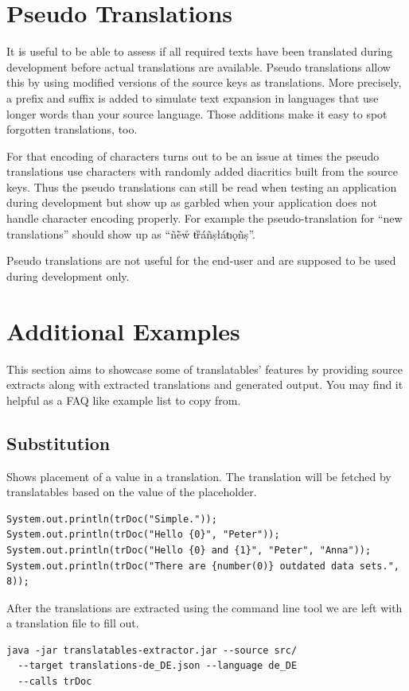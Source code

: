 \documentclass[a4paper,11pt,twoside]{report}
\begin{document}
\section{Pseudo Translations}
It is useful to be able to assess if all required texts have been translated during development before actual translations are available. Pseudo translations allow this by using modified versions of the source keys as translations. More precisely, a prefix and suffix is added to simulate text expansion in languages that use longer words than your source language. Those additions make it easy to spot forgotten translations, too.

For that encoding of characters turns out to be an issue at times the pseudo translations use characters with randomly added diacritics built from the source keys. Thus the pseudo translations can still be read when testing an application during development but show up as garbled when your application does not handle character encoding properly. For example the pseudo-translation for “new translations” should show up as “ñḕẘ ŧȑáñșłáŧıǫñș”.

Pseudo translations are not useful for the end-user and are supposed to be used during development only.

\section{Additional Examples}
This section aims to showcase some of translatables' features by providing source extracts along with extracted translations and generated output. You may find it helpful as a \ac{FAQ} like example list to copy from.

\subsection{Substitution}
Shows placement of a value in a translation. The translation will be fetched by translatables based on the value of the placeholder.
\begin{lstlisting}
System.out.println(trDoc("Simple."));
System.out.println(trDoc("Hello {0}", "Peter"));
System.out.println(trDoc("Hello {0} and {1}", "Peter", "Anna"));
System.out.println(trDoc("There are {number(0)} outdated data sets.", 8));
\end{lstlisting}
After the translations are extracted using the command line tool we are left with a translation file to fill out.

\begin{verbatim}
java -jar translatables-extractor.jar --source src/
  --target translations-de_DE.json --language de_DE
  --calls trDoc
\end{verbatim}
\end{document}
